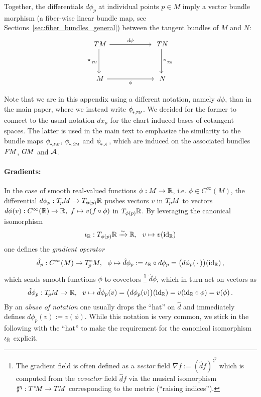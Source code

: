 Together, the differentials $d\phi_p$ at individual points $p\in M$ imply a vector bundle morphism (a fiber-wise linear bundle map, see Sections~\ref{sec:fiber_bundles_general}) between the tangent bundles of $M$ and $N$:
\begin{equation}
\begin{tikzcd}[column sep=60pt, row sep=35, font=\normalsize]
    TM
        \arrow[r, "d\phi"]
        \arrow[d, "\piTM"']
    &
    TN
        \arrow[d, "\piTM"]
    \\
    M
        \arrow[r, "\phi"']
    &
    N
\end{tikzcd}
\end{equation}

Note that we are in this appendix using a different notation, namely $d\phi$, than in the main paper, where we instead write $\dphiTM$.
We decided for the former to connect to the usual notation $dx_\mu$ for the chart induced bases of cotangent spaces.
The latter is used in the main text to emphasize the similarity to the bundle maps $\dphiFM$, $\dphiGM$ and $\dphiA$, which are induced on the associated bundles $F\mkern-1.5muM$, $G\mkern-1.4muM$ and $\mathcal{A}$.



\paragraph{Gradients:}
In the case of smooth real-valued functions $\phi: M \to \mathbb{R}$, i.e. $\phi \in C^\infty(M)$, the differential $d\phi_p: T_{\mkern-1.5mu p}\mkern-.5muM \to T_{\phi(p)}\mathbb{R}$ pushes vectors $v$ in $T_{\mkern-1.5mu p}\mkern-.5muM$ to vectors $d\phi(v): C^\infty(\mathbb{R}) \to \mathbb{R},\ f \mapsto v(f \circ \phi)$ in $T_{\phi(p)}\mathbb{R}$.
By leveraging the canonical isomorphism
\begin{align}\label{eq:canon_isom_TR_R}
    \iota_{\R}: T_{\phi(p)}\R \xrightarrow{\sim} \R,\ \ v \mapsto v(\id_{\R})
\end{align}
one defines the \emph{gradient operator}
\begin{align}
    \hat{d}_p: C^\infty(M) \to T_{\mkern-1.5mu p}^{\mkern-0mu *}\mkern-1muM,\ \ \phi \mapsto  \hat{d}\phi_p := \iota_{\mathbb{R}} \circ d\phi_p = \big( d\phi_p(\,\cdot\,) \big)(\mathrm{id}_{\mathbb{R}}) \,,
\end{align}
which sends smooth functions $\phi$ to covectors%
\footnote{
    The gradient field is often defined as a \emph{vector} field $\nabla f := (\hat{d}f)^{\sharp^\eta}$ which is computed from the \emph{covector} field $\hat{d}f$ via the musical isomorphism $\sharp^\eta: T^{\mkern0.5mu *}\mkern-3.5muM \to T\mkern-1.5muM$ corresponding to the metric (``raising indices'').
}
$\hat{d}\phi$, which in turn act on vectors as
\begin{align}\label{eq:gradient_vector_action}
    \hat{d}\phi_p: \TpM \to \R,\ \ v \mapsto \hat{d}\phi_p(v) = \big( d\phi_p(v) \big)(\id_{\R}) = v(\id_{\R} \circ \phi) = v(\phi) \,.
\end{align}
By an \emph{abuse of notation} one usually drops the ``hat'' on $\hat{d}$ and immediately defines $d\phi_p(v) := v(\phi)$.
While this notation is very common, we stick in the following with the ``hat'' to make the requirement for the canonical isomorphism $\iota_{\mathbb{R}}$ explicit.

